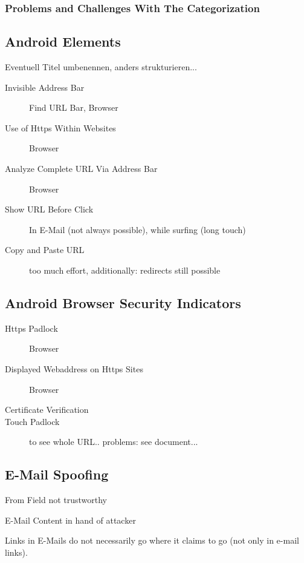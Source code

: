\subsubsection{Problems and Challenges With The Categorization}

\subsection{Android Elements}
Eventuell Titel umbenennen, anders strukturieren...
\begin{description}
	\item[Invisible Address Bar] Find URL Bar, Browser
	\item[Use of Https Within Websites] Browser
	\item[Analyze Complete URL Via Address Bar] Browser
	\item[Show URL Before Click] In E-Mail (not always possible), while surfing (long touch)
	\item[Copy and Paste URL] too much effort, additionally: redirects still possible
\end{description}

\subsection{Android Browser Security Indicators}

\begin{description}
		\item[Https Padlock] Browser
		\item[Displayed Webaddress on Https Sites] Browser
		\item[Certificate Verification]
		\item[Touch Padlock] to see whole URL.. problems: see document...
\end{description}

\subsection{E-Mail Spoofing}

\begin{description}
	\item{From Field} not trustworthy
	\item{E-Mail Content} in hand of attacker
	\item{Links in E-Mails} do not necessarily go where it claims to go (not only in e-mail links).
\end{description}

